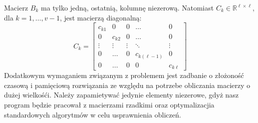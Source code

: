 \documentclass{article}
\begin{document}
	Macierz $B_k$ ma tylko jedną, ostatnią, kolumnę niezerową. Natomiast $C_k \in \mathbb{R}^{\ell \times \ell}$, dla $k = 1, \ldots, v - 1$, jest macierzą diagonalną:\\
	\[
	C_k = \begin{bmatrix}
	    c_{k1} & 0 & 0 & \dots & 0 \\
	    0 & c_{k2} & 0 & \dots & 0 \\
	    \vdots & \vdots & \vdots & \ddots & \vdots \\
	    0 & \dots & 0 & c_{k(\ell-1)} & 0 \\
	    0 & \dots & 0 & 0 & c_{k\ell}
	\end{bmatrix}
	\]
	Dodatkowym wymaganiem związanym z problemem jest zadbanie o złożoność czasową i pamięciową rozwiązania ze względu na potrzebe obliczania macierzy o dużej wielkośći. Należy zapamietywać jedynie elementy niezerowe, gdyż nasz program będzie pracował z macierzami rzadkimi oraz optymalizacjia standardowych algorytmów w celu usprawnienia obliczeń.
\end{document}
